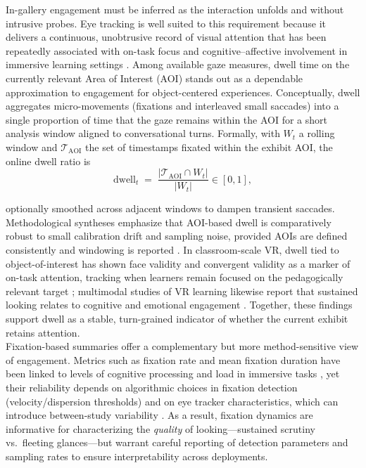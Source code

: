 \documentclass[12pt]{article}
\begin{document}
In-gallery engagement must be inferred as the interaction unfolds and without intrusive probes. Eye tracking is well suited to this requirement because it delivers a continuous, unobtrusive record of visual attention that has been repeatedly associated with on-task focus and cognitive–affective involvement in immersive learning settings \citep{Bozkir2021,Dubovi2022,Mikhailenko2022}. Among available gaze measures, dwell time on the currently relevant Area of Interest (AOI) stands out as a dependable approximation to engagement for object-centered experiences. Conceptually, dwell aggregates micro-movements (fixations and interleaved small saccades) into a single proportion of time that the gaze remains within the AOI for a short analysis window aligned to conversational turns. Formally, with $W_t$ a rolling window and $\mathcal{T}_{\text{AOI}}$ the set of timestamps fixated within the exhibit AOI, the online dwell ratio is\\
\[
\text{dwell}_t \;=\; \frac{\lvert \mathcal{T}_{\text{AOI}} \cap W_t \rvert}{\lvert W_t \rvert}\in[0,1],
\]

optionally smoothed across adjacent windows to dampen transient saccades. Methodological syntheses emphasize that AOI-based dwell is comparatively robust to small calibration drift and sampling noise, provided AOIs are defined consistently and windowing is reported \citep{holmqvist2011eyetracking,orquin2018}. In classroom-scale VR, dwell tied to object-of-interest has shown face validity and convergent validity as a marker of on-task attention, tracking when learners remain focused on the pedagogically relevant target \citep{Bozkir2021}; multimodal studies of VR learning likewise report that sustained looking relates to cognitive and emotional engagement \citep{Dubovi2022,Mikhailenko2022}. Together, these findings support dwell as a stable, turn-grained indicator of whether the current exhibit retains attention.\\

Fixation-based summaries offer a complementary but more method-sensitive view of engagement. Metrics such as fixation rate and mean fixation duration have been linked to levels of cognitive processing and load in immersive tasks \citep{Kim2023,Wang2023}, yet their reliability depends on algorithmic choices in fixation detection (velocity/dispersion thresholds) and on eye tracker characteristics, which can introduce between-study variability \citep{holmqvist2011eyetracking}. As a result, fixation dynamics are informative for characterizing the \emph{quality} of looking—sustained scrutiny vs.\ fleeting glances—but warrant careful reporting of detection parameters and sampling rates to ensure interpretability across deployments.\\
\end{document}
